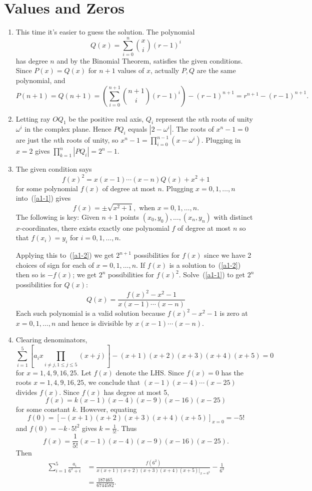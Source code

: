 \section{Values and Zeros}
\begin{enumerate}
\item This time it's easier to guess the solution. The polynomial 
\[Q(x)=\sum_{i=0}^n \binom{x}{i} (r-1)^i\]%
has degree $n$ and by the Binomial Theorem, satisfies the given conditions. Since $P(x)=Q(x)$ for $n+1$ values of $x$, actually $P,Q$ are the same polynomial, and 
\[P(n+1)=Q(n+1)=\left(\sum_{i=0}^{n+1} \binom{n+1}{i} (r-1)^i\right)-(r-1)^{n+1}=r^{n+1}-(r-1)^{n+1}.\]

\item Letting ray $OQ_1$ be the positive real axis, $Q_i$ represent the $n$th roots of unity $\omega^i$ in the complex plane. Hence $PQ_i$ equals $|2-\omega^i|$. The roots of $x^n-1=0$ are just the $n$th roots of unity, so $x^n-1=\prod_{i=0}^{n-1} (x-\omega^i)$. Plugging in $x=2$ gives $\prod_{k=1}^n |PQ_i|=2^n-1$.

\item The given condition says
\begin{equation}f(x)^2=x(x-1)\cdots (x-n)Q(x)+x^2+1
\label{a1-1}
\end{equation}
for some polynomial $f(x)$ of degree at most $n$. Plugging $x=0,1,\ldots ,n$ into~(\ref{a1-1}) gives
\begin{equation}f(x)=\pm\sqrt{x^2+1},\text{ when }x=0,1,\ldots, n.
\label{a1-2}
\end{equation}
The following is key:
Given $n+1$ points $(x_0,y_0),\ldots, (x_n,y_n)$ with distinct $x$-coordinates, there exists exactly one polynomial $f$ of degree at most $n$ so that $f(x_i)=y_i$ for $i=0,1,\ldots, n$.

Applying this to~(\ref{a1-2}) we get $2^{n+1}$ possibilities for $f(x)$ since we have 2 choices of sign for each of $x=0,1,\ldots, n$. If $f(x)$ is a solution to~(\ref{a1-2}) then so is $-f(x)$; we get $2^n$ possibilities for $f(x)^2$. Solve~(\ref{a1-1}) to get $2^n$ possibilities for $Q(x)$:
\[Q(x)=\frac{f(x)^2-x^2-1}{x(x-1)\cdots (x-n)}\]
Each such polynomial is a valid solution because $f(x)^2-x^2-1$ is zero at $x=0,1,\ldots, n$ and hence is divisible by $x(x-1)\cdots (x-n)$.

\item Clearing denominators,
\[\sum_{i=1}^5 \left[a_i x\prod_{i\neq j, 1\leq j\leq 5} (x+j)\right]-(x+1)(x+2)(x+3)(x+4)(x+5)=0\]
for $x=1,4,9,16,25$. Let $f(x)$ denote the LHS. Since $f(x)=0$ has the roots $x=1,4,9,16,25$, we conclude that $(x-1)(x-4)\cdots (x-25)$ divides $f(x)$. Since $f(x)$ has degree at most 5, \[f(x)=k(x-1)(x-4)(x-9)(x-16)(x-25)\] for some constant $k$. However, equating
\[f(0)=[-(x+1)(x+2)(x+3)(x+4)(x+5)]_{x=0}=-5!\]
and $f(0)=-k\cdot 5!^2$ gives $k=\frac{1}{5!}$. Thus
\[f(x)=\frac{1}{5!}(x-1)(x-4)(x-9)(x-16)(x-25).\]
Then 
\begin{align*}
\sum_{i=1}^5 \frac{a_i}{6^2+i}&=\frac{f(6^2)}{x(x+1)(x+2)(x+3)(x+4)(x+5)|_{x=6^2}}-\frac{1}{6^2}\\
&=\frac{187465}{6744582}.
\end{align*}


\end{enumerate}
